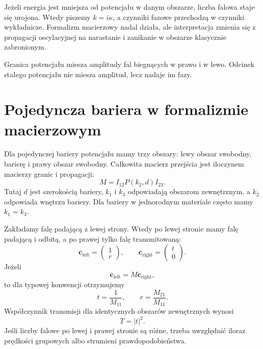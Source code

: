 Jeżeli energia jest mniejsza od potencjału w danym obszarze, liczba falowa staje się urojona. Wtedy piszemy \(k=i\kappa\), a czynniki fazowe przechodzą w czynniki wykładnicze. Formalizm macierzowy nadal działa, ale interpretacja zmienia się z propagacji oscylacyjnej na narastanie i zanikanie w obszarze klasycznie zabronionym.

\begin{summarybox}
Granica potencjału miesza amplitudy fal biegnących w prawo i w lewo. Odcinek stałego potencjału nie miesza amplitud, lecz nadaje im fazy.
\end{summarybox}

\section{Pojedyncza bariera w formalizmie macierzowym}

Dla pojedynczej bariery potencjału mamy trzy obszary: lewy obszar swobodny, barierę i prawy obszar swobodny. Całkowita macierz przejścia jest iloczynem macierzy granic i propagacji:
\begin{equation}
    M=I_{12}P(k_2,d)I_{23}.
\end{equation}
Tutaj \(d\) jest szerokością bariery, \(k_1\) i \(k_3\) odpowiadają obszarom zewnętrznym, a \(k_2\) odpowiada wnętrzu bariery. Dla bariery w jednorodnym materiale często mamy \(k_1=k_3\).

Zakładamy falę padającą z lewej strony. Wtedy po lewej stronie mamy falę padającą i odbitą, a po prawej tylko falę transmitowaną:
\begin{equation}
    \mathbf{c}_{\mathrm{left}}=\begin{pmatrix}1\\ r\end{pmatrix},
    \qquad
    \mathbf{c}_{\mathrm{right}}=\begin{pmatrix}t\\ 0\end{pmatrix}.
\end{equation}
Jeżeli
\begin{equation}
    \mathbf{c}_{\mathrm{left}}=M\mathbf{c}_{\mathrm{right}},
\end{equation}
to dla typowej konwencji otrzymujemy
\begin{equation}
    t=\frac{1}{M_{11}},
    \qquad
    r=\frac{M_{21}}{M_{11}}.
\end{equation}
Współczynnik transmisji dla identycznych obszarów zewnętrznych wynosi
\begin{equation}
    T=|t|^2.
\end{equation}
Jeśli liczby falowe po lewej i prawej stronie są różne, trzeba uwzględnić iloraz prędkości grupowych albo strumieni prawdopodobieństwa.

